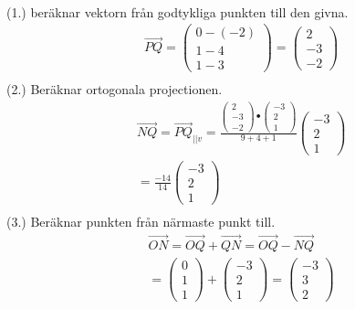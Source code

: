 \begin{multicols}{2}
\begin{align*}
\end{align*}
(1.) beräknar vektorn från godtykliga punkten till den givna.
\begin{align*}
  &\overrightarrow{PQ}=
  \begin{pmatrix} 0- (-2) \\ 1 -4 \\ 1 -3 \end{pmatrix} =
  \begin{pmatrix} 2 \\ -3 \\ -2 \end{pmatrix} \\
\end{align*}
(2.) Beräknar ortogonala projectionen.
\begin{align*}
  &\overrightarrow{NQ}=\overrightarrow{PQ}_{||v}
  =\frac{\begin{pmatrix} 2 \\ -3 \\ -2 \end{pmatrix}\bullet{}
    \begin{pmatrix} -3 \\ 2 \\ 1 \end{pmatrix}}{9+4+1}
  \begin{pmatrix} -3 \\ 2 \\ 1 \end{pmatrix} \\
  &=\frac{-14}{14}\begin{pmatrix} -3 \\ 2 \\ 1 \end{pmatrix} \\
\end{align*}
(3.) Beräknar punkten från närmaste punkt till.
\begin{align*}
  &\overrightarrow{ON}=\overrightarrow{OQ}+\overrightarrow{QN}=
  \overrightarrow{OQ}-\overrightarrow{NQ} \\
  &=
  \begin{pmatrix} 0 \\ 1 \\ 1 \end{pmatrix}+
  \begin{pmatrix} -3 \\ 2 \\ 1 \end{pmatrix}=
  \begin{pmatrix} -3 \\ 3 \\ 2 \end{pmatrix} \\

\end{align*}
\end{multicols}
